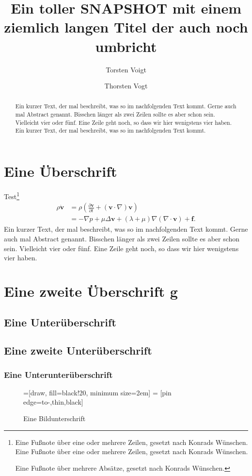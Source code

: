 \documentclass{mfosnapshot}
\author{Torsten Voigt \and Thorsten Vogt}
\title{Ein toller SNAPSHOT mit einem ziemlich langen Titel der auch noch umbricht}
\begin{document}
\begin{abstract}
Ein kurzer Text, der mal beschreibt, was so im nachfolgenden Text kommt. Gerne auch mal Abstract genannt. Bisschen l\"anger als zwei Zeilen sollte es aber schon sein. Vielleicht vier oder f\"unf. Eine Zeile geht noch, so dass wir hier wenigstens vier haben. Ein kurzer Text, der mal beschreibt, was so im nachfolgenden Text kommt.
\end{abstract}


\section{Eine \"Uberschrift}
\noindent\blindtext[1]Test\footnote{Eine Fu\ss note \"uber eine oder mehrere Zeilen, gesetzt nach Konrads W\"unschen. Eine Fu\ss note \"uber eine oder mehrere Zeilen, gesetzt nach Konrads W\"unschen.

Eine Fu\ss note \"uber mehrere Abs\"atze, gesetzt nach Konrads W\"unschen.}
\begin{align}
	\rho \dot{\mathbf{v}}
	 &= \rho \left( \frac{\partial\mathbf{v}}{\partial t} + (\mathbf{v} \cdot \nabla) \mathbf{v} \right)\\
	 &=-\nabla p + \mu \Delta \mathbf{v} + (\lambda + \mu) \nabla (\nabla \cdot \mathbf{v})+\mathbf{f}.
\end{align}
Ein kurzer Text, der mal beschreibt, was so im nachfolgenden Text kommt. Gerne auch mal Abstract genannt. Bisschen l\"anger als zwei Zeilen sollte es aber schon sein. Vielleicht vier oder f\"unf. Eine Zeile geht noch, so dass wir hier wenigstens vier haben.

\section{Eine zweite \"Uberschrift g}
\subsection{Eine Unter\"uberschrift}
\blindtext

\blindtext

\subsection{Eine zweite Unter\"uberschrift}
\subsubsection{Eine Unterunter\"uberschrift}
\begin{figure}
\centering
{}=[draw, fill=black!20, minimum size=2em]
 = [pin edge={to-,thin,black}]
\caption{Eine Bildunterschrift}
\end{figure}
\blindtext[2]
\end{document}
